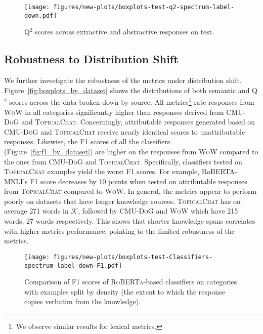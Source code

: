 \begin{figure}[ht]
\centering
\texttt{[image: figures/new-plots/boxplots-test-q2-spectrum-label-down.pdf]}
 
\caption{\small Q$^2$ scores across extractive and abstractive responses on \begindata{} test. }
  \label{fig:q2_density}
\end{figure}

\subsection{Robustness to Distribution Shift} We further investigate the robustness of the metrics under distribution shift. Figure~\ref{fig:boxplots_by_dataset} shows the distributions of both semantic and Q$^2$ scores across the data broken down by source. All metrics\footnote{We observe similar results for lexical metrics.} rate responses from \textsc{WoW} in all categories significantly higher than responses derived from \textsc{CMU-DoG} and \textsc{TopicalChat}. Concerningly, attributable responses generated based on \textsc{CMU-DoG} and \textsc{TopicalChat} receive nearly identical scores to unattributable responses. Likewise, the F1 scores of all the classifiers (Figure~\ref{fig:f1_by_dataset}) are higher on the responses from \textsc{WoW} compared to the ones from \textsc{CMU-DoG} and \textsc{TopicalChat}. Specifically, classifiers tested on \textsc{TopicalChat} examples yield the worst F1 scores. For example, RoBERTA-MNLI's F1 score decreases by 10 points when tested on attributable responses from \textsc{TopicalChat} compared to \textsc{WoW}. 
In general, the metrics appear to perform poorly on datasets that have longer knowledge sources.  \textsc{TopicalChat} has on average  271 words in $\mathcal{K}$, followed by \textsc{CMU-DoG} and \textsc{WoW} which have 215 words, 27 words respectively. 
This shows that shorter knowledge spans correlates with higher metrics performance, pointing to the limited robustness of the metrics.  

 






















\begin{figure*}[ht]
\centering
\texttt{[image: figures/new-plots/boxplots-test-Classifiers-spectrum-label-down-F1.pdf]}
\caption{\small Comparison of F1 scores of \textsc{RoBERTa}-based classifiers on \begindata{} categories with examples split by density (the extent to which the response copies verbatim from the knowledge). }
\label{fig:f1scoresbydensity}
\end{figure*}

